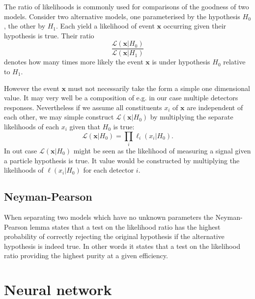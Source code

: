 The ratio of likelihoods is commonly used for comparisons of the goodness of two models. Consider two alternative models, one parameterised by the hypothesis $H_0$, the other by $H_1$. Each yield a likelihood of event $\pmb{x}$ occurring given their hypothesis is true. Their ratio
\begin{equation*}
	\frac{\mathcal{L}(\pmb{x}|H_0)}{\mathcal{L}(\pmb{x}|H_1)}
\end{equation*} denotes how many times more likely the event $\pmb{x}$ is under hypothesis $H_0$ relative to $H_1$.

However the event $\pmb{x}$ must not necessarily take the form a simple one dimensional value. It may very well be a composition of e.g. in our case multiple detectors responses. Nevertheless if we assume all constituents $x_i$ of $\pmb{x}$ are independent of each other, we may simple construct $\mathcal{L}(\pmb{x}|H_0)$ by multiplying the separate likelihoods of each $x_i$ given that $H_0$ is true:
\begin{equation*}
	\mathcal{L}(\pmb{x}|H_0) = \prod \limits_{i} \ell_i(x_i|H_0).
\end{equation*}
In out case $\mathcal{L}(\pmb{x}|H_0)$ might be seen as the likelihood of measuring a signal given a particle hypothesis is true. It value would be constructed by multiplying the likelihoods of $\ell(x_i|H_0)$ for each detector $i$.

\subsection{Neyman-Pearson}
\label{subsec:likelihood_ratios_neyman_pearson}

When separating two models which have no unknown parameters the Neyman-Pearson lemma states that a test on the likelihood ratio has the highest probability of correctly rejecting the original hypothesis if the alternative hypothesis is indeed true. In other words it states that a test on the likelihood ratio providing the highest purity at a given efficiency.

\section{Neural network}
\label{sec:neural_network}
